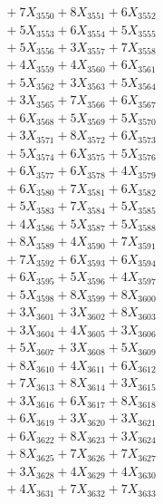 \documentclass[a4paper,10pt]{article}
\begin{document}
{\begin{align}
&\;  + 7 X_{3550} + 8 X_{3551} + 6 X_{3552} \\[0.3ex]
&\;  + 5 X_{3553} + 6 X_{3554} + 5 X_{3555} \\[0.3ex]
&\;  + 5 X_{3556} + 3 X_{3557} + 7 X_{3558} \\[0.3ex]
&\;  + 4 X_{3559} + 4 X_{3560} + 6 X_{3561} \\[0.3ex]
&\;  + 5 X_{3562} + 3 X_{3563} + 5 X_{3564} \\[0.3ex]
&\;  + 3 X_{3565} + 7 X_{3566} + 6 X_{3567} \\[0.3ex]
&\;  + 6 X_{3568} + 5 X_{3569} + 5 X_{3570} \\[0.3ex]
&\;  + 3 X_{3571} + 8 X_{3572} + 6 X_{3573} \\[0.3ex]
&\;  + 5 X_{3574} + 6 X_{3575} + 5 X_{3576} \\[0.3ex]
&\;  + 6 X_{3577} + 6 X_{3578} + 4 X_{3579} \\[0.5ex]\allowbreak
&\;  + 6 X_{3580} + 7 X_{3581} + 6 X_{3582} \\[0.3ex]
&\;  + 5 X_{3583} + 7 X_{3584} + 5 X_{3585} \\[0.3ex]
&\;  + 4 X_{3586} + 5 X_{3587} + 5 X_{3588} \\[0.3ex]
&\;  + 8 X_{3589} + 4 X_{3590} + 7 X_{3591} \\[0.3ex]
&\;  + 7 X_{3592} + 6 X_{3593} + 6 X_{3594} \\[0.3ex]
&\;  + 6 X_{3595} + 5 X_{3596} + 4 X_{3597} \\[0.3ex]
&\;  + 5 X_{3598} + 8 X_{3599} + 8 X_{3600} \\[0.3ex]
&\;  + 3 X_{3601} + 3 X_{3602} + 8 X_{3603} \\[0.3ex]
&\;  + 3 X_{3604} + 4 X_{3605} + 3 X_{3606} \\[0.3ex]
&\;  + 5 X_{3607} + 3 X_{3608} + 5 X_{3609} \\[0.5ex]\allowbreak
&\;  + 8 X_{3610} + 4 X_{3611} + 6 X_{3612} \\[0.3ex]
&\;  + 7 X_{3613} + 8 X_{3614} + 3 X_{3615} \\[0.3ex]
&\;  + 3 X_{3616} + 6 X_{3617} + 8 X_{3618} \\[0.3ex]
&\;  + 6 X_{3619} + 3 X_{3620} + 3 X_{3621} \\[0.3ex]
&\;  + 6 X_{3622} + 8 X_{3623} + 3 X_{3624} \\[0.3ex]
&\;  + 8 X_{3625} + 7 X_{3626} + 7 X_{3627} \\[0.3ex]
&\;  + 3 X_{3628} + 4 X_{3629} + 4 X_{3630} \\[0.3ex]
&\;  + 4 X_{3631} + 7 X_{3632} + 7 X_{3633} \\[0.3ex]

\end{align}}
\end{document}

